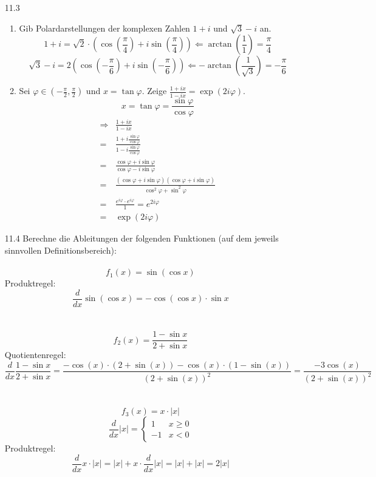 \documentclass{HM}
\begin{document}
\begin{enumerate}
\item[11.3]
\begin{enumerate}
	\item Gib Polardarstellungen der komplexen Zahlen $1+i$ und $\sqrt{3}-i$ an.
	$$1+i = \sqrt{2}\cdot \left(\cos\left(\frac{\pi}{4}\right)+i\sin\left(\frac{\pi}{4}\right)\right) \Leftarrow \arctan\left(\frac{1}{1}\right)=\frac{\pi}{4}$$
	$$\sqrt{3}-i=2\left(\cos\left(-\frac{\pi}{6}\right)+i\sin\left(-\frac{\pi}{6}\right)\right) \Leftarrow -\arctan\left(\frac{1}{\sqrt{3}}\right)=-\frac{\pi}{6}$$
	\item Sei $\varphi\in\left(-\frac{\pi}{2},\frac{\pi}{2}\right)$ und $x=\tan\varphi$. Zeige $\frac{1+ix}{1-ix}=\exp(2i\varphi)$.
	$$x=\tan\varphi=\frac{\sin\varphi}{\cos\varphi}$$
	\begin{align*}
		\Rightarrow &\frac{1+ix}{1-ix}\\
		=&\frac{1+i\frac{\sin\varphi}{\cos\varphi}}{1-i\frac{\sin\varphi}{\cos\varphi}}\\
		=&\frac{\cos\varphi+i\sin\varphi}{\cos\varphi-i\sin\varphi}\\
		=&\frac{(\cos\varphi+i\sin\varphi)(\cos\varphi+i\sin\varphi)}{\cos^2\varphi+\sin^2\varphi}\\
		=&\frac{e^{i\varphi}\cdot e^{i\varphi}}{1}=e^{2i\varphi}\\
		=&\exp(2i\varphi)	
	\end{align*}
\end{enumerate}
\item [11.4] Berechne die Ableitungen der folgenden Funktionen (auf dem jeweils sinnvollen Definitionsbereich):\\\\
$$f_1(x)=\sin(\cos x)$$
Produktregel:
$$\frac{d}{dx}\sin(\cos x) = -\cos(\cos x)\cdot\sin x$$\\\\
$$f_2(x)=\frac{1-\sin x}{2+\sin x}$$
Quotientenregel:
$$\frac{d}{dx}\frac{1-\sin x}{2+\sin x}=\frac{-\cos(x)\cdot(2+\sin(x))-\cos(x)\cdot(1-\sin(x))}{(2+\sin(x))^2}=\frac{-3\cos(x)}{(2+\sin(x))^2}$$\\\\
$$f_3(x)=x\cdot|x|$$
$$\frac{d}{dx}|x|=\begin{cases}
1&x\geq0\\
-1&x<0
\end{cases}$$
Produktregel:
$$\frac{d}{dx}x\cdot|x|=|x|+x\cdot\frac{d}{dx}|x|=|x|+|x|=2|x|$$\\\\

\end{enumerate}
\end{document}
